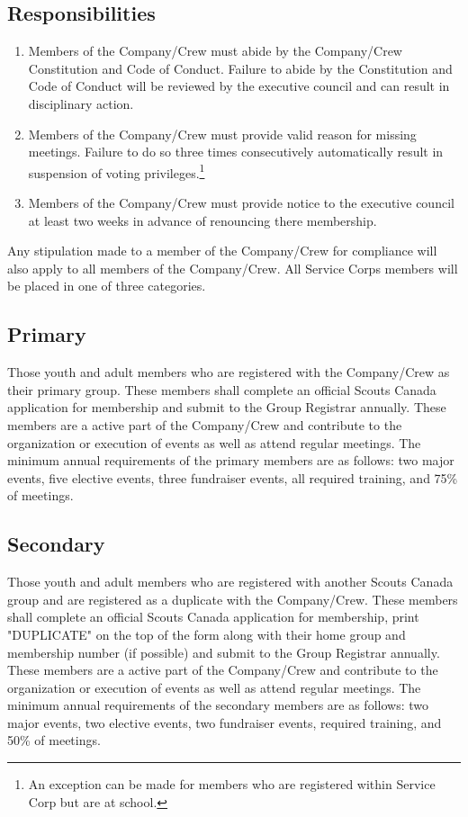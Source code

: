 \documentclass{Service_Corps_Document}
\begin{document}
\subsection{Responsibilities}
\begin{enumerate}
	\item Members of the Company/Crew must abide by the Company/Crew Constitution and Code of Conduct. Failure to abide by the Constitution and Code of Conduct will be reviewed by the executive council and can result in disciplinary action. 
	\item Members of the Company/Crew must provide valid reason for missing meetings. Failure to do so three times consecutively automatically result in suspension of voting privileges.\footnote{An exception can be made for members who are registered within Service Corp but are at school.}
	\item Members of the Company/Crew must provide notice to the executive council at least two weeks in advance of renouncing there membership.
\end{enumerate}
Any stipulation made to a member of the Company/Crew for compliance will also apply to all members of the Company/Crew. All Service Corps members will be placed in one of three categories.
\subsection{Primary}
Those youth and adult members who are registered with the Company/Crew as their primary group. These members shall complete an official Scouts Canada application for membership and submit to the Group Registrar annually. These members are a active part of the Company/Crew and contribute to the organization or execution of events as well as attend regular meetings. The minimum annual requirements of the primary members are as follows: two major events, five elective events, three fundraiser events, all required training, and 75\% of meetings.
\subsection{Secondary}
Those youth and adult members who are registered with another Scouts Canada group and are registered as a duplicate with the Company/Crew. These members shall complete an official Scouts Canada application for membership, print "DUPLICATE" on the top of the form along with their home group and membership number (if possible) and submit to the Group Registrar annually. These members are a active part of the Company/Crew and contribute to the organization or execution of events as well as attend regular meetings. The minimum annual requirements of the secondary members are as follows: two major events, two elective events, two fundraiser events, required training, and 50\% of meetings. 
\end{document}
